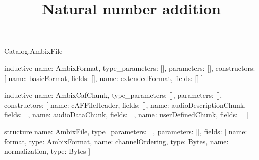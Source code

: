 \begin{lexlean}{Catalog.AmbixFile}
\title{Natural number addition}
\begin{semanticmodule}
inductive{
  name: AmbixFormat,
  type_parameters: [],
  parameters: [],
  constructors: [
    {name: basicFormat, fields: []},
    {name: extendedFormat, fields: []}
  ]
}

inductive{
  name: AmbixCafChunk,
  type_parameters: [],
  parameters: [],
  constructors: [
    {name: cAFFileHeader, fields: []},
    {name: audioDescriptionChunk, fields: []},
    {name: audioDataChunk, fields: []},
    {name: userDefinedChunk, fields: []}
  ]
}

structure{
  name: AmbixFile,
  type_parameters: [],
  parameters: [],
  fields: [
    {name: format, type: AmbixFormat},
    {name: channelOrdering, type: Bytes},
    {name: normalization, type: Bytes}
  ]
}
\end{semanticmodule}
\end{lexlean}
